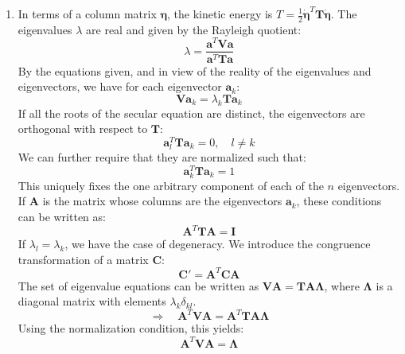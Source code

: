 \documentclass[12pt]{article}
\begin{document}
\begin{enumerate}
		\item In terms of a column matrix $\boldsymbol{\eta}$, the kinetic energy is $T = \frac{1}{2} \dot{\boldsymbol{\eta}}^T \mathbf{T} \dot{\boldsymbol{\eta}}$. The eigenvalues $\lambda$ are real and given by the Rayleigh quotient:
		\[
		\lambda = \frac{\mathbf{a}^T \mathbf{V} \mathbf{a}}{\mathbf{a}^T \mathbf{T} \mathbf{a}}
		\]
		By the equations given, and in view of the reality of the eigenvalues and eigenvectors, we have for each eigenvector $\mathbf{a}_k$:
		\[
		\mathbf{V} \mathbf{a}_k = \lambda_k \mathbf{T} \mathbf{a}_k
		\]
		If all the roots of the secular equation are distinct, the eigenvectors are orthogonal with respect to $\mathbf{T}$:
		\[
		\mathbf{a}_l^T \mathbf{T} \mathbf{a}_k = 0, \quad l \neq k
		\]
		We can further require that they are normalized such that:
		\[
		\mathbf{a}_k^T \mathbf{T} \mathbf{a}_k = 1
		\]
		This uniquely fixes the one arbitrary component of each of the $n$ eigenvectors. If $\mathbf{A}$ is the matrix whose columns are the eigenvectors $\mathbf{a}_k$, these conditions can be written as:
		\[
		\mathbf{A}^T \mathbf{T} \mathbf{A} = \mathbf{I}
		\]
		If $\lambda_l = \lambda_k$, we have the case of degeneracy. We introduce the congruence transformation of a matrix $\mathbf{C}$:
		\[
		\mathbf{C}' = \mathbf{A}^T \mathbf{C} \mathbf{A}
		\]
		The set of eigenvalue equations can be written as $\mathbf{V}\mathbf{A} = \mathbf{T}\mathbf{A}\mathbf{\Lambda}$, where $\mathbf{\Lambda}$ is a diagonal matrix with elements $\lambda_k \delta_{kl}$.
		\[
		\Rightarrow \quad \mathbf{A}^T \mathbf{V} \mathbf{A} = \mathbf{A}^T \mathbf{T} \mathbf{A} \mathbf{\Lambda}
		\]
		Using the normalization condition, this yields:
		\[
		\mathbf{A}^T \mathbf{V} \mathbf{A} = \mathbf{\Lambda}
		\]
		

\end{enumerate}
\end{document}

